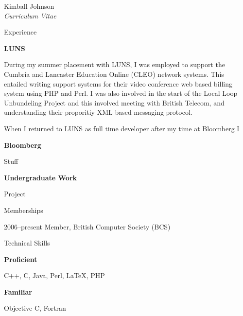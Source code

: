 \documentclass[10pt]{article}
\newenvironment{sublist}{%
	\begin{list}{}{%
		\setlength{\itemsep}{0em}\setlength{\parsep}{0em}%
		\setlength{\topsep}{0em}\setlength{\parskip}{0em}%
	}%
}%
{ \end{list} }
\newenvironment{subbulletlist}{%
	\begin{list}{\labelitemii}{%
		\setlength{\topsep}{\itemsep}\setlength{\parskip}{\parsep}%
	}%
}%
{ \end{list} }
\begin{document}
\begin{cv}{Kimball Johnson\\{\large \itshape Curriculum Vitae}}

\setlength{\cvlabelwidth}{\oldcvlabelwidth}

\setlength{\oldcvlabelwidth}{\cvlabelwidth}
\setlength{\cvlabelwidth}{1em}
\begin{cvlist}{Experience}
	\item \textbf{LUNS}
	\begin{sublist}
		\item 
        During my summer placement with LUNS, I was employed to support
        the Cumbria and Lancaster Education Online (CLEO) network systems. This
        entailed writing support systems for their video conference web based billing
        system using PHP and Perl. I was also involved in the start of the Local Loop
        Unbundeling Project and this involved meeting with British Telecom, and
        understanding their proporitiy XML based messaging protocol.
        \item
        When I returned to LUNS as full time developer after my time at
        Bloomberg I 
	\end{sublist}

	\item \textbf{Bloomberg}
	\begin{subbulletlist}
    \item Stuff
	\end{subbulletlist}
\pagebreak
{}
	\item \textbf{Undergraduate Work}
	\begin{subbulletlist}
    \item Project
	\end{subbulletlist}
\end{cvlist}
\setlength{\cvlabelwidth}{\oldcvlabelwidth}

\begin{cvlist}{Memberships}
	\item[2006--present] Member, British Computer Society (BCS)
\end{cvlist}

\setlength{\oldcvlabelwidth}{\cvlabelwidth}
\setlength{\cvlabelwidth}{1em}
\begin{cvlist}{Technical Skills}
	\item \textbf{Proficient}
	\begin{sublist}
		\item C++, C, Java, Perl, LaTeX, PHP
	\end{sublist}
	\item \textbf{Familiar} 
	\begin{sublist}
		\item Objective C, Fortran
	\end{sublist}
\end{cvlist}
\setlength{\cvlabelwidth}{\oldcvlabelwidth}


\end{cv}
\end{document}
